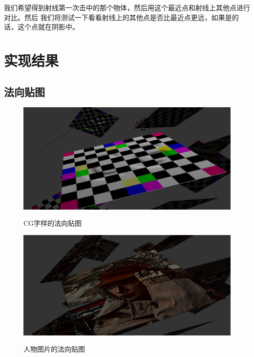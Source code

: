 \documentclass{article}
\begin{document}
	我们希望得到射线第一次击中的那个物体，然后用这个最近点和射线上其他点进行对比。然后
	我们将测试一下看看射线上的其他点是否比最近点更远，如果是的话，这个点就在阴影中。

	\section{实现结果}
	\subsection{法向贴图}
	
	\begin{figure}[htb]
		\caption{\label{table.label} CG字样的法向贴图} \centering
		\begin{center}
			\includegraphics[width=5in]{normal1.jpg}
			\label{figure.label}
		\end{center}
	\end{figure}
	\begin{figure}[htb]
		\caption{\label{table.label} 人物图片的法向贴图} \centering
		\begin{center}
			\includegraphics[width=5in]{normal2.jpg}
			\label{figure.label}
		\end{center}
	\end{figure}
\end{document}
